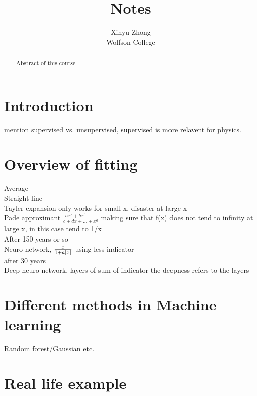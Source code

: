 \documentclass[12pt,a4paper]{article}
\author{Xinyu Zhong\\Wolfson College}
\title{Notes}
\begin{document}
\begin{titlepage}
    \maketitle
\end{titlepage}

\tableofcontents

\newpage

\begin{abstract}
\noindent
Abstract of this course
\end{abstract}
\section{Introduction}
mention supervised vs. unsupervised, supervised is more relavent for physics.
\section{Overview of fitting}
Average\\
Straight line\\
Tayler expansion only works for small x, disaster at large x\\
Pade approximant $\frac{ax^2+bx^3+...}{c+dx+...+x^6}$ making sure that f(x) does not tend to infinity at large x, in this case tend to 1/x\\
After 150 years or so \\
Neuro network, $\frac{x}{1+a\abs{x}}$ using less indicator\\
after 30 years\\
Deep neuro network, layers of sum of indicator
the deepness refers to the layers

\section{Different methods in Machine learning}
Random forest/Gaussian etc.
\section{Real life example}
\end{document}
